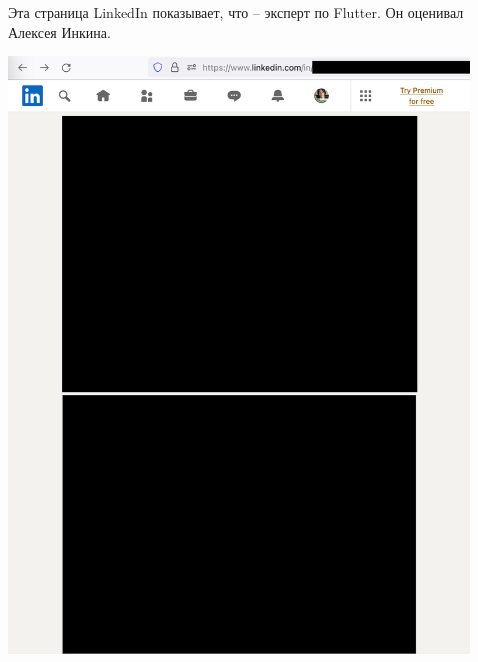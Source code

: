 
Эта страница LinkedIn показывает, что \MrGdeMemberInterviewer -- эксперт по Flutter.
Он оценивал Алексея Инкина.

\begin{center}
    \includegraphics[width=33em]{gde-member-interviewer-linkedin-p1_public}
\end{center}
\WillContinue
\pagebreak

